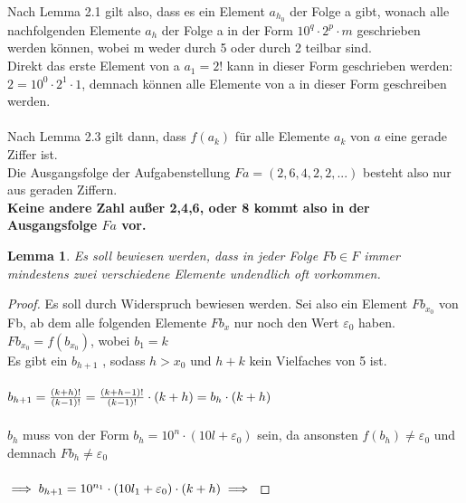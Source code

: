 \documentclass[12pt, letterpaper]{article}
\newtheorem{lemma}[theorem]{Lemma}
\begin{document}
Nach Lemma 2.1 gilt also, dass es ein Element $a_{h_{0}}$ der Folge a gibt, wonach alle nachfolgenden Elemente $a_{h}$ der Folge a in der Form $10^{q}\cdot 2^{p}\cdot m$ geschrieben werden können, wobei m weder durch 5 oder durch 2 teilbar sind.\\
Direkt das erste Element von a $a_{1} = 2!$ kann in dieser Form geschrieben werden: $2 = 10^{0}\cdot 2^{1}\cdot 1$, demnach können alle Elemente von a in dieser Form geschreiben werden.\\\\
Nach Lemma 2.3 gilt dann, dass $f(a_{k})$ für alle Elemente $a_{k}$ von $a$ eine gerade Ziffer ist.\\
Die Ausgangsfolge der Aufgabenstellung $Fa= (2,6,4,2,2,...)$ besteht also nur aus geraden Ziffern.\\\textbf{Keine andere Zahl außer 2,4,6, oder 8 kommt also in der Ausgangsfolge $Fa$ vor.} 
\begin{lemma}
  Es soll bewiesen werden, dass in jeder Folge $Fb \in F$ immer mindestens zwei verschiedene Elemente undendlich oft vorkommen.
\end{lemma}
\begin{proof}
  Es soll durch Widerspruch bewiesen werden. Sei also ein Element $Fb_{x_{0}}$ von Fb, ab dem alle folgenden Elemente $Fb_{x}$ nur noch den Wert $\varepsilon_{0}$ haben.\\
  $Fb_{x_{0}} = f(b_{x_{0}})$, wobei $b_{1} = k$\\
  Es gibt ein $b_{h+1}$ , sodass $h>x_{0}$ und $h+k$ kein Vielfaches von 5 ist. \\\\
    \begin{math}
      b_{h+1} =  \frac{(k+h)!}{(k-1)!} \\\\
      =\frac{(k+h-1)!}{(k-1)!}\cdot (k+h) \\\\
      =b_{h}\cdot (k+h)
    \end{math}\\\\
  $b_{h}$ muss von der Form $b_{h} = 10^{n}\cdot (10l+\varepsilon_{0})$ sein, da ansonsten $f(b_{h}) \neq \varepsilon_{0}$ und demnach $Fb_{h} \neq \varepsilon_{0}$\\\\
  \begin{math}
    \implies b_{h+1} = 10^{n_{1}}\cdot (10l_{1}+\varepsilon_{0}) \cdot (k+h)\\\\
    \implies 
  \end{math}

  \end{proof}
\end{document}
